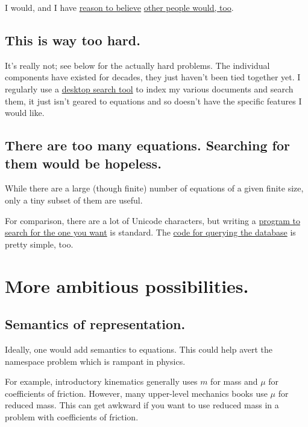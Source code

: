 \documentclass[12pt,letterpaper]{article}
\begin{document}
I would, and I have \href{http://www.researchgate.net/post/I_am_looking_for_an_equation_database_or_digital_list_of_equations}{reason to believe} \href{http://productforums.google.com/forum/#!topic/websearch/lVJiyCSl-xk}{other people would, too}.

\subsection{This is way too hard.}

It's really not; see below for the actually hard problems. The individual components have existed for decades, they just haven't been tied together yet. I regularly use a \href{https://en.wikipedia.org/wiki/Recoll}{desktop search tool} to index my various documents and search them, it just isn't geared to equations and so doesn't have the specific features I would like.

\subsection{There are too many equations. Searching for them would be hopeless.}

While there are a large (though finite) number of equations of a given finite size, only a tiny subset of them are useful.

For comparison, there are a lot of Unicode characters, but writing a \href{https://mail.python.org/pipermail/python-announce-list/2003-April/002183.html}{program to search for the one you want} is standard. The \href{http://sources.debian.net/src/unicode/0.9.7/unicode}{code for querying the database} is pretty simple, too.

\section{More ambitious possibilities.}

\subsection{Semantics of representation.}

Ideally, one would add semantics to equations. This could help avert the namespace problem which is rampant in physics.

For example, introductory kinematics generally uses $m$ for mass and $\mu$ for coefficients of friction. However, many upper-level mechanics books use $\mu$ for reduced mass. This can get awkward if you want to use reduced mass in a problem with coefficients of friction.
\end{document}
